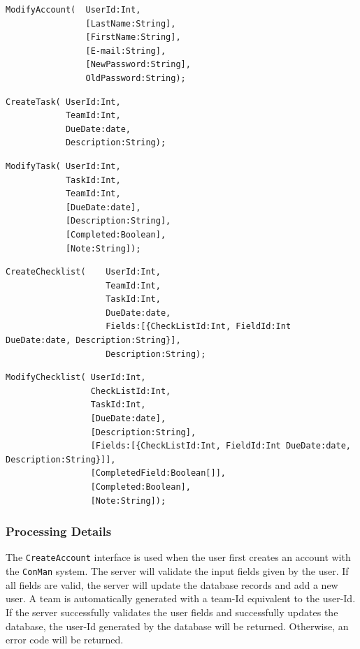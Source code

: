 \documentclass{article}
\begin{document}
\begin{lstlisting}
ModifyAccount(  UserId:Int,
                [LastName:String],
                [FirstName:String],
                [E-mail:String],
                [NewPassword:String],
                OldPassword:String);
\end{lstlisting}

\begin{lstlisting}
CreateTask( UserId:Int,
            TeamId:Int,
            DueDate:date,
            Description:String);
\end{lstlisting}

\begin{lstlisting}
ModifyTask( UserId:Int,
            TaskId:Int,
            TeamId:Int,
            [DueDate:date],
            [Description:String],
            [Completed:Boolean],
            [Note:String]);
\end{lstlisting}

\begin{lstlisting}
CreateChecklist(    UserId:Int,
                    TeamId:Int,
                    TaskId:Int,
                    DueDate:date,
                    Fields:[{CheckListId:Int, FieldId:Int DueDate:date, Description:String}],
                    Description:String);
\end{lstlisting}

\begin{lstlisting}
ModifyChecklist( UserId:Int,
                 CheckListId:Int,
                 TaskId:Int,
                 [DueDate:date],
                 [Description:String],
                 [Fields:[{CheckListId:Int, FieldId:Int DueDate:date, Description:String}]],
                 [CompletedField:Boolean[]],
                 [Completed:Boolean],
                 [Note:String]);
\end{lstlisting}

\subsubsection{Processing Details}
The \texttt{CreateAccount} interface is used when the user first creates an account with the \texttt{ConMan} system.
The server will validate the input fields given by the user.
If all fields are valid, the server will update the database records and add a new user.
A team is automatically generated with a team-Id equivalent to the user-Id.
If the server successfully validates the user fields and successfully updates the database, the user-Id generated by the database will be returned.
Otherwise, an error code will be returned.
\end{document}
